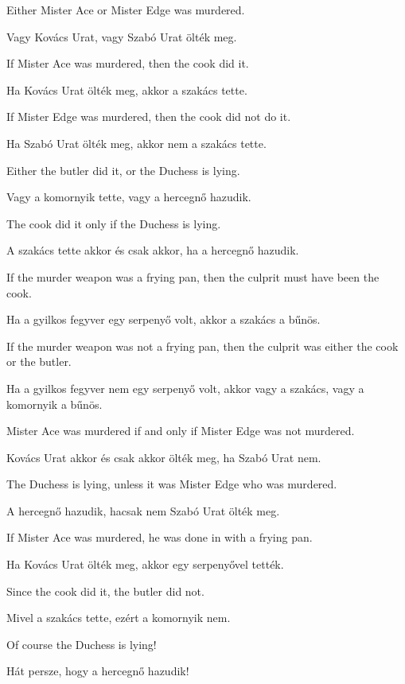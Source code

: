 \begin{earg}
\item Either Mister Ace or Mister Edge was murdered.
\item Vagy Kovács Urat, vagy Szabó Urat ölték meg.
\item If Mister Ace was murdered, then the cook did it.
\item Ha Kovács Urat ölték meg, akkor a szakács tette.
\item If Mister Edge was murdered, then the cook did not do it.
\item Ha Szabó Urat ölték meg, akkor nem a szakács tette.
\item Either the butler did it, or the Duchess is lying.
\item Vagy a komornyik tette, vagy a hercegnő hazudik.
\item The cook did it only if the Duchess is lying.
\item A szakács tette akkor és csak akkor, ha a hercegnő hazudik.
\item If the murder weapon was a frying pan, then the culprit must have been the cook.
\item Ha a gyilkos fegyver egy serpenyő volt, akkor a szakács a bűnös.
\item If the murder weapon was not a frying pan, then the culprit was either the cook or the butler.
\item Ha a gyilkos fegyver nem egy serpenyő volt, akkor vagy a szakács, vagy a komornyik a bűnös.
\item Mister Ace was murdered if and only if Mister Edge was not murdered.
\item Kovács Urat akkor és csak akkor ölték meg, ha Szabó Urat nem.
\item The Duchess is lying, unless it was Mister Edge who was murdered.
\item A hercegnő hazudik, hacsak nem Szabó Urat ölték meg.
\item If Mister Ace was murdered, he was done in with a frying pan.
\item Ha Kovács Urat ölték meg, akkor egy serpenyővel tették.
\item Since the cook did it, the butler did not.
\item Mivel a szakács tette, ezért a komornyik nem.
\item Of course the Duchess is lying!
\item Hát persze, hogy a hercegnő hazudik!
\end{earg}



